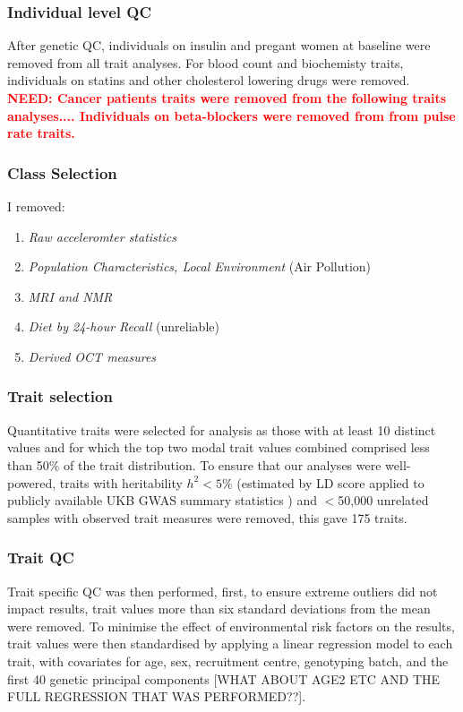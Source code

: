 \documentclass[times]{zHenriquesLab-StyleBioRxiv}
\newcommand\need[1]{\textbf{\textcolor{red}{NEED: #1}}}
\begin{document}
\subsubsection*{Individual level QC}
After genetic QC, individuals on insulin and pregant women at baseline
were removed from all trait analyses. For blood count and biochemisty
traits, individuals on statins and other cholesterol lowering drugs
were removed. \need{Cancer patients traits were removed from the
  following traits analyses.... Individuals on beta-blockers were
removed from from pulse rate traits.}


\subsubsection*{Class Selection} 

I removed: 
\begin{enumerate} 
    \item \textit{Raw acceleromter statistics} 
    \item \textit{Population Characteristics, Local Environment} (Air Pollution) 
    \item \textit{MRI and NMR} 
    \item \textit{Diet by 24-hour Recall} (unreliable)  
    \item \textit{Derived OCT measures} 
\end{enumerate} 



\subsubsection*{Trait selection}
Quantitative traits were selected for analysis as those with at least
10 distinct values and for which the top two modal trait values
combined comprised less than 50\% of the trait distribution. To ensure
that our analyses were well-powered, traits with heritability
$h^2<5\%$ (estimated by LD score \citep{ldsc} applied to publicly
available UKB GWAS summary statistics \citep{neale}) and $<$50,000
unrelated samples with observed trait measures were removed, this gave
175 traits.




\subsubsection*{Trait QC}
Trait specific QC was then performed, first, to ensure extreme
outliers did not impact results, trait values more than six
standard deviations from the mean were removed. To minimise the effect
of environmental risk factors on the results, trait values were then
standardised by applying a linear regression model to each trait, with
covariates for age, sex, recruitment centre, genotyping batch, and the
first 40 genetic principal components [WHAT ABOUT AGE2 ETC AND THE
FULL REGRESSION THAT WAS PERFORMED??].
\end{document}
